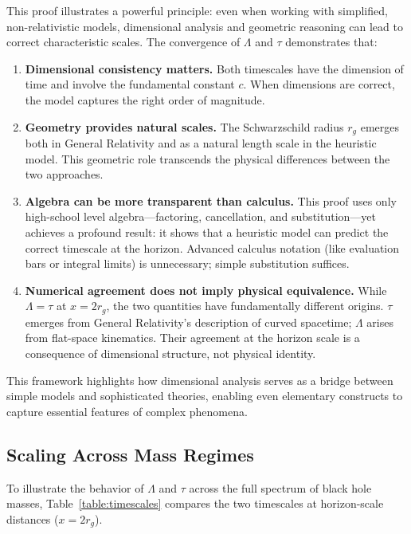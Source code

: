 \documentclass[12pt,a4paper]{article}
\begin{document}
This proof illustrates a powerful principle: even when working with simplified, non-relativistic models, dimensional analysis and geometric reasoning can lead to correct characteristic scales. The convergence of $\Lambda$ and $\tau$ demonstrates that:

\begin{enumerate}
    \item \textbf{Dimensional consistency matters.} Both timescales have the dimension of time and involve the fundamental constant $c$. When dimensions are correct, the model captures the right order of magnitude.
    
    \item \textbf{Geometry provides natural scales.} The Schwarzschild radius $r_g$ emerges both in General Relativity and as a natural length scale in the heuristic model. This geometric role transcends the physical differences between the two approaches.
    
    \item \textbf{Algebra can be more transparent than calculus.} This proof uses only high-school level algebra—factoring, cancellation, and substitution—yet achieves a profound result: it shows that a heuristic model can predict the correct timescale at the horizon. Advanced calculus notation (like evaluation bars or integral limits) is unnecessary; simple substitution suffices.
    
    \item \textbf{Numerical agreement does not imply physical equivalence.} While $\Lambda = \tau$ at $x = 2r_g$, the two quantities have fundamentally different origins. $\tau$ emerges from General Relativity's description of curved spacetime; $\Lambda$ arises from flat-space kinematics. Their agreement at the horizon scale is a consequence of dimensional structure, not physical identity.
\end{enumerate}

This framework highlights how dimensional analysis serves as a bridge between simple models and sophisticated theories, enabling even elementary constructs to capture essential features of complex phenomena.

\subsection{Scaling Across Mass Regimes}

To illustrate the behavior of $\Lambda$ and $\tau$ across the full spectrum of black hole masses, Table~\ref{table:timescales} compares the two timescales at horizon-scale distances ($x = 2r_g$).
\end{document}
